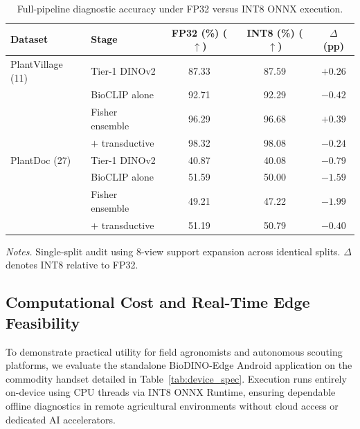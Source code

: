 \documentclass[preprint,12pt]{elsarticle}
\begin{document}
\begin{table}[htbp]
\caption{Full-pipeline diagnostic accuracy under FP32 versus INT8 ONNX execution.}
\label{tab:quantization}
\centering

\footnotesize
\setlength{\tabcolsep}{4pt}
\begin{tabular*}{\columnwidth}{@{\extracolsep{\fill}}llccc}
\toprule
\textbf{Dataset} & \textbf{Stage} & \textbf{FP32 (\%) ($\uparrow$)} & \textbf{INT8 (\%) ($\uparrow$)} & \textbf{$\Delta$ (pp)} \\
\midrule
PlantVillage (11) & Tier-1 DINOv2 & 87.33 & 87.59 & $+0.26$ \\
 & BioCLIP alone & 92.71 & 92.29 & $-0.42$ \\
 & Fisher ensemble & 96.29 & 96.68 & $+0.39$ \\
 & $+$ transductive & 98.32 & 98.08 & $-0.24$ \\
\midrule
PlantDoc (27) & Tier-1 DINOv2 & 40.87 & 40.08 & $-0.79$ \\
 & BioCLIP alone & 51.59 & 50.00 & $-1.59$ \\
 & Fisher ensemble & 49.21 & 47.22 & $-1.99$ \\
 & $+$ transductive & 51.19 & 50.79 & $-0.40$ \\
\bottomrule
\end{tabular*}

\vspace{3pt}
\begin{minipage}{\columnwidth}
\footnotesize
\textit{Notes.} Single-split audit using 8-view support expansion across identical splits. $\Delta$ denotes INT8 relative to FP32.
\end{minipage}
\end{table}

\subsection{Computational Cost and Real-Time Edge Feasibility}
\label{sec:edge_hardware}

To demonstrate practical utility for field agronomists and autonomous scouting platforms, we evaluate the standalone BioDINO-Edge Android application on the commodity handset detailed in Table~\ref{tab:device_spec}. Execution runs entirely on-device using CPU threads via INT8 ONNX Runtime, ensuring dependable offline diagnostics in remote agricultural environments without cloud access or dedicated AI accelerators.
\end{document}
